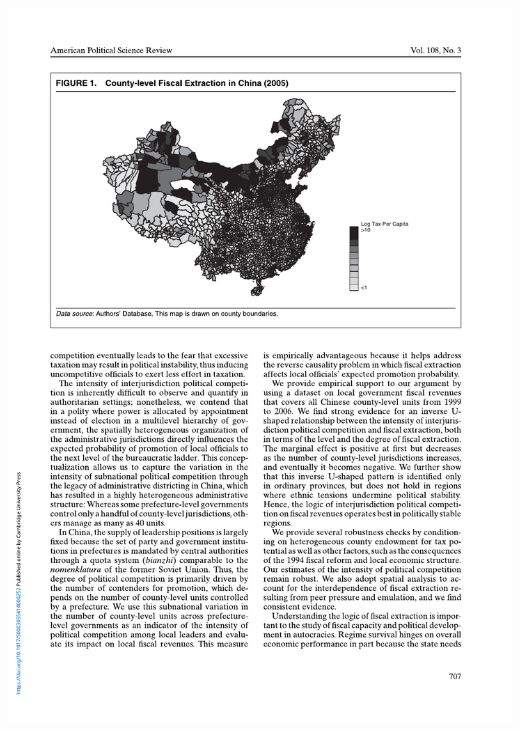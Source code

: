 \documentclass[
  10pt,
  ignorenonframetext,
]{beamer}
\begin{document}
\begin{frame}
\begin{center}\includegraphics[width=0.9\linewidth]{Figs/Examples/lu_fig1} \end{center}
\end{frame}
\end{document}
